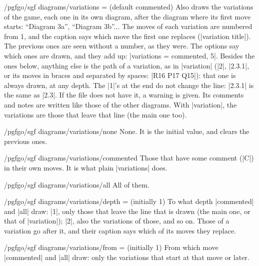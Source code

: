 \begin{key}{/pgfgo/sgf diagrams/variations =  (default commented)}
	Also draws the variations of the game, each one in its own diagram, after the diagram where its first move starts: ``Diagram 3a'', ``Diagram 3b''... The moves of each variation are numbered from 1, and the caption says which move the first one replaces (|variation title|). The previous ones are seen without a number, as they were. The options say which ones are drawn, and they add up: |variations = {commented, 5}|. Besides the ones below, anything else is the path of a variation, as in |variation| (|2|, |2.3.1|, or its moves in braces and separated by spaces: |{R16 P17 Q15}|): that one is always drawn, at any depth. The |1|'s at the end do not change the line: |2.3.1| is the same as |2.3|. If the file does not have it, a warning is given. Its comments and notes are written like those of the other diagrams. With |variation|, the variations are those that leave that line (the main one too).

	\begin{codeexample}[]
	\end{codeexample}
\end{key}

\begin{stylekey}{/pgfgo/sgf diagrams/variations/none}
	None. It is the initial value, and clears the previous ones.
\end{stylekey}

\begin{stylekey}{/pgfgo/sgf diagrams/variations/commented}
	Those that have some comment (|C|) in their own moves. It is what plain |variations| does.
\end{stylekey}

\begin{stylekey}{/pgfgo/sgf diagrams/variations/all}
	All of them.
\end{stylekey}

\begin{key}{/pgfgo/sgf diagrams/variations/depth =  (initially 1)}
	To what depth |commented| and |all| draw: |1|, only those that leave the line that is drawn (the main one, or that of |variation|); |2|, also the variations of those, and so on. Those of a variation go after it, and their caption says which of its moves they replace.
\end{key}

\begin{key}{/pgfgo/sgf diagrams/variations/from =  (initially 1)}
	From which move |commented| and |all| draw: only the variations that start at that move or later.

	\begin{codeexample}
	\end{codeexample}
\end{key}

